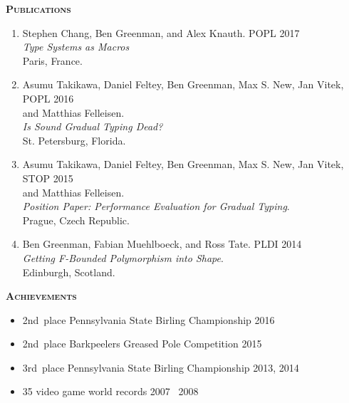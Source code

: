 \documentclass{article}
\newcommand{\mysection}[1]{\vspace{0.5cm}
\hspace{-1.3cm}\textsc{\textbf{#1}}~\hrulefill}
\begin{document}
\mysection{Publications}
\begin{enumerate}
\item
  Stephen Chang, Ben Greenman, and Alex Knauth. \hfill POPL 2017 \\
   \emph{Type Systems as Macros} \\
  Paris, France.
\item
  Asumu Takikawa, Daniel Feltey, Ben Greenman, Max S. New, Jan Vitek, \hfill POPL 2016 \\
   and Matthias Felleisen. \\
   \emph{Is Sound Gradual Typing Dead?} \\
  St. Petersburg, Florida.
\item
  Asumu Takikawa, Daniel Feltey, Ben Greenman, Max S. New, Jan Vitek, \hfill STOP 2015 \\
   and Matthias Felleisen. \\
   \emph{Position Paper: Performance Evaluation for Gradual Typing}. \\
  Prague, Czech Republic.
\item
  Ben Greenman, Fabian Muehlboeck, and Ross Tate. \hfill PLDI 2014 \\
  \emph{Getting F-Bounded Polymorphism into Shape}. \\
  Edinburgh, Scotland.
\end{enumerate}


\mysection{Achievements}

\begin{itemize}
\item 2nd~place Pennsylvania State Birling Championship \hfill 2016
\item 2nd~place Barkpeelers Greased Pole Competition \hfill 2015
\item 3rd~place Pennsylvania State Birling Championship \hfill 2013, 2014
\item 35 video game world records \hfill 2007 \textendash\ 2008
\end{itemize}
\end{document}
